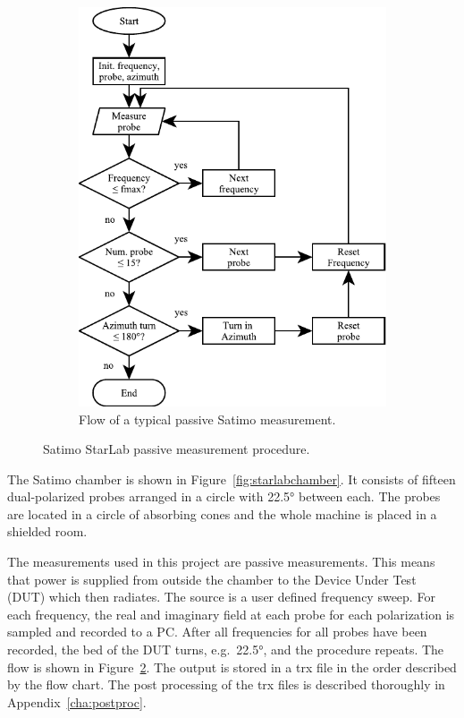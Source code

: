 \begin{figure}[htbp]
\begin{subfigure}[t]{0.49\linewidth}
        \includegraphics{img/analysis/satimoflow}
        \caption{Flow of a typical passive Satimo measurement.}
        \label{fig:satimoflow}
    \end{subfigure}
    \caption{Satimo StarLab passive measurement procedure.}
\end{figure}

The Satimo chamber is shown in Figure~\ref{fig:starlabchamber}. It consists of fifteen dual-polarized probes arranged in a circle with \ang{22.5} between each. The probes are located in a circle of absorbing cones and the whole machine is placed in a shielded room.

The measurements used in this project are passive measurements. This means that power is supplied from outside the chamber to the Device Under Test (DUT) which then radiates. The source is a user defined frequency sweep. For each frequency, the real and imaginary field at each probe for each polarization is sampled and recorded to a PC. After all frequencies for all probes have been recorded, the bed of the DUT turns, e.g.\ \ang{22.5}, and the procedure repeats. The flow is shown in Figure~\ref{fig:satimoflow}. The output is stored in a trx file in the order described by the flow chart. The post processing of the trx files is described thoroughly in Appendix~\ref{cha:postproc}.


